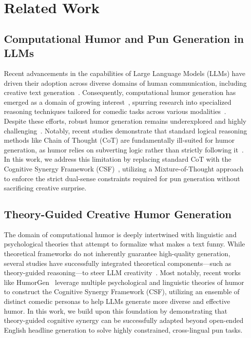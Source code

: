 \documentclass[]{ceurart}
\begin{document}
\section{Related Work}


\subsection{Computational Humor and Pun Generation in LLMs}
Recent advancements in the capabilities of Large Language Models (LLMs) have driven their adoption across diverse domains of human communication, including creative text generation~\cite{yang2024human}. Consequently, computational humor generation has emerged as a domain of growing interest~\cite{cao2025humorous}, spurring research into specialized reasoning techniques tailored for comedic tasks across various modalities~\cite{zhong2024let, wang2024innovative}. Despite these efforts, robust humor generation remains underexplored and highly challenging~\cite{zhang2026humorchain, goel2024automating}. Notably, recent studies demonstrate that standard logical reasoning methods like Chain of Thought (CoT) are fundamentally ill-suited for humor generation, as humor relies on subverting logic rather than strictly following it~\cite{zhong2024let}. In this work, we address this limitation by replacing standard CoT with the Cognitive Synergy Framework (CSF)~\cite{ajayi2026humorgen}, utilizing a Mixture-of-Thought approach to enforce the strict dual-sense constraints required for pun generation without sacrificing creative surprise.


\subsection{Theory-Guided Creative Humor Generation}
The domain of computational humor is deeply intertwined with linguistic and psychological theories that attempt to formalize what makes a text funny. While theoretical frameworks do not inherently guarantee high-quality generation, several studies have successfully integrated theoretical components---such as theory-guided reasoning---to steer LLM creativity~\cite{zhang2026humorchain, lemmens2026computational}. Most notably, recent works like HumorGen~\cite{ajayi2026humorgen} leverage multiple psychological and linguistic theories of humor to construct the Cognitive Synergy Framework (CSF), utilizing an ensemble of distinct comedic personas to help LLMs generate more diverse and effective humor. In this work, we build upon this foundation by demonstrating that theory-guided cognitive synergy can be successfully adapted beyond open-ended English headline generation to solve highly constrained, cross-lingual pun tasks.
\end{document}
